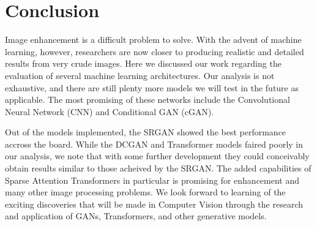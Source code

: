 \documentclass[letterpaper]{article} %
\begin{document}
\section{Conclusion}
Image enhancement is a difficult problem to solve.
With the advent of machine learning, however, researchers are now closer
to producing realistic and detailed results from very crude images.
Here we discussed our work regarding the evaluation of several machine learning architectures.
Our analysis is not exhaustive, and there are still plenty more models we will
test in the future as applicable. The most promising of these networks include the
Convolutional Neural Network (CNN) and Conditional GAN (cGAN).

Out of the models implemented, the SRGAN showed the best performance accross the board.
While the DCGAN and Transformer models faired poorly in our analysis,
we note that with some further development they could conceivably obtain results similar to
those acheived by the SRGAN.
The added capabilities of Sparse Attention Transformers in particular is promising
for enhancement and many other image processing problems.
We look forward to learning of the exciting discoveries that will be made in Computer Vision
through the research and application of GANs, Transformers, and other generative models.
\end{document}
